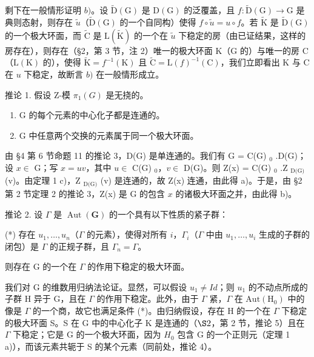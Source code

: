 剩下在一般情形证明 \(b)\)。设 \(\tilde{\mathrm{D}}(\mathrm{G})\) 是 \(\mathrm{D}(\mathrm{G})\) 的泛覆盖，且 \(f: \tilde{\mathrm{D}}(\mathrm{G}) \to \mathrm{G}\) 是典则态射，则存在 \(\tilde{u}\)（\(\tilde{\mathrm{D}}(\mathrm{G})\) 的一个自同构）使得 \(f \circ \tilde{u} = u \circ f\)。若 \(\tilde{\mathrm{K}}\) 是 \(\tilde{\mathrm{D}}(\mathrm{G})\) 的一个极大环面，而 \(\tilde{\mathrm{C}}\) 是 \(\mathrm{L}(\tilde{\mathrm{K}})\) 的一个在 \(\tilde{u}\) 下稳定的房（由已证结果，这样的房存在），则存在（§2，第 3 节，注 2）唯一的极大环面 \(\mathrm{K}\)（\(\mathrm{G}\) 的）与唯一的房 \(\mathrm{C}\)（\(\mathrm{L}(\mathrm{K})\) 的），使得 \(\tilde{\mathrm{K}} = f^{-1}(\mathrm{K})\) 且 \(\tilde{\mathrm{C}} = \mathrm{L}(f)^{-1}(\mathrm{C})\)，我们立即看出 \(\mathrm{K}\) 与 \(\mathrm{C}\) 在 \(u\) 下稳定，故断言 \(b)\) 在一般情形成立。

推论 1. 假设 Z-模 \(\pi_{1}(G)\) 是无挠的。

\begin{enumerate}
\def\labelenumi{\alph{enumi})}
\item
  G 的每个元素的中心化子都是连通的。
\item
  G 中任意两个交换的元素属于同一个极大环面。
\end{enumerate}

由 §4 第 6 节命题 11 的推论 3，D(G) 是单连通的。我们有 G = C(G) \(_0\) .D(G)；设 \(x \in\) G；写 \(x = uv\)，其中 \(u \in\) C(G) \(_0\)，\(v \in\) D(G)。则 Z(x) = C(G) \(_0\) .Z \(_{\text{D(G)}}\) (v)。由定理 1 c)，Z \(_{\text{D(G)}}\) (v) 是连通的，故 Z(x) 连通，由此得 a)。于是，由 §2 第 2 节定理 2 的推论 3，Z(x) 是 G 的包含 \(x\) 的诸极大环面之并，由此得 b)。

推论 2. 设 \(\Gamma\) 是 \(\operatorname{Aut}(\mathbf{G})\) 的一个具有以下性质的紧子群：

(*) 存在 \(u_{1}, \ldots, u_{n}\)（\(\Gamma\) 的元素），使得对所有 \(i\)，\(\Gamma_{i}\)（\(\Gamma\) 中由 \(u_{1}, \ldots, u_{i}\) 生成的子群的闭包）是 \(\Gamma\) 的正规子群，且 \(\Gamma_{n} = \Gamma\)。

则存在 G 的一个在 \(\Gamma\) 的作用下稳定的极大环面。

我们对 G 的维数用归纳法论证。显然，可以假设 \(u_{1} \neq Id\)；则 \(u_{1}\) 的不动点所成的子群 H 异于 G，且在 \(\varGamma\) 的作用下稳定。此外，由于 \(\varGamma\) 紧，\(\varGamma\) 在 \(\mathrm{Aut}(\mathrm{H}_{0})\) 中的像是 \(\varGamma\) 的一个商，故它也满足条件 (*)。由归纳假设，存在 H 的一个在 \(\varGamma\) 下稳定的极大环面 S。S 在 G 中的中心化子 K 是连通的（\(\S2\)，第 2 节，推论 5）且在 \(\varGamma\) 下稳定；它是 G 的一个极大环面，因为 \(H_{0}\) 包含 G 的一个正则元（定理 1 a)），而该元素共轭于 S 的某个元素（同前处，推论 4）。

